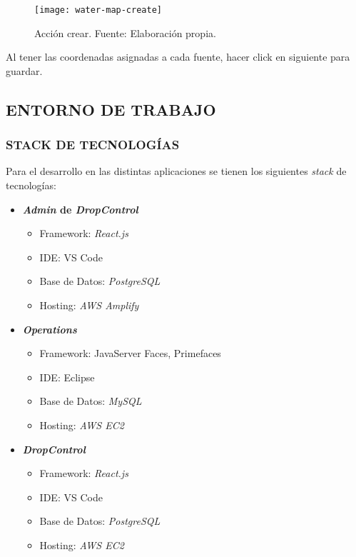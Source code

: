 \begin{figure}[H]
   \centering
   \texttt{[image: water-map-create]}
   \caption{\label{fig:water-map-create} Acción crear. Fuente: Elaboración propia.}
\end{figure}

Al tener las coordenadas asignadas a cada fuente, hacer click en siguiente para guardar.
\fi


\subsection{ENTORNO DE TRABAJO}

\subsubsection{STACK DE TECNOLOGÍAS}

Para el desarrollo en las distintas aplicaciones se tienen los siguientes \textit{stack} de tecnologías:

\begin{itemize}
    \item \textbf{\textit{Admin} de \textit{DropControl}}
    \begin{itemize}
        \item Framework: \textit{React.js}
        \item IDE: VS Code
        \item Base de Datos: \textit{PostgreSQL}
        \item Hosting: \textit{AWS Amplify}
    \end{itemize}
    \item \textbf{\textit{Operations}}
    \begin{itemize}
        \item Framework: JavaServer Faces, Primefaces
        \item IDE: Eclipse
        \item Base de Datos: \textit{MySQL}
        \item Hosting: \textit{AWS EC2}
    \end{itemize}
    \item \textbf{\textit{DropControl}}
    \begin{itemize}
        \item Framework: \textit{React.js}
        \item IDE: VS Code
        \item Base de Datos: \textit{PostgreSQL}
        \item Hosting: \textit{AWS EC2}
    \end{itemize}
    \iffalse\item \textbf{\textit{SETUP}}
    \begin{itemize}
        \item Framework: JavaServer Faces, Primefaces
        \item IDE: Eclipse
        \item Base de Datos: \textit{PostgreSQL}
        \item Hosting: \textit{AWS EC2}
    \end{itemize}\fi
\end{itemize}

